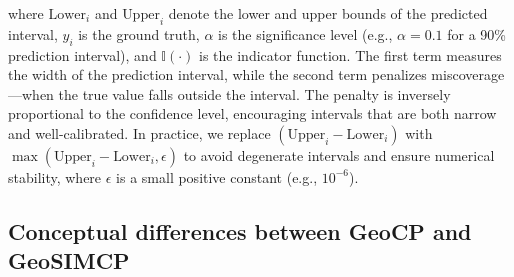 \documentclass[authoryear,preprint,review,12pt]{elsarticle}
\begin{document}
where \(\text{Lower}_i\) and \(\text{Upper}_i\) denote the lower and upper bounds of the predicted interval, \(y_i\) is the ground truth, \(\alpha\) is the significance level (e.g., \(\alpha = 0.1\) for a 90\% prediction interval), and \(\mathbb{I}(\cdot)\) is the indicator function. The first term measures the width of the prediction interval, while the second term penalizes miscoverage—when the true value falls outside the interval. The penalty is inversely proportional to the confidence level, encouraging intervals that are both narrow and well-calibrated. In practice, we replace \((\text{Upper}_i - \text{Lower}_i)\) with \(\max(\text{Upper}_i - \text{Lower}_i, \epsilon)\) to avoid degenerate intervals and ensure numerical stability, where \(\epsilon\) is a small positive constant (e.g., \(10^{-6}\)).




\subsection{Conceptual differences between GeoCP and GeoSIMCP}

\end{document}

